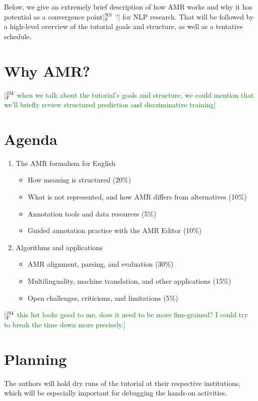 \documentclass[12pt,a4paper]{article}
\newcommand{\ensuretext}[1]{#1}
\newcommand{\jmfmarker}{\ensuretext{\textcolor{green}{\ensuremath{^{\textsc{JM}}_{\textsc{F}}}}}}
\newcommand{\nssmarker}{\ensuretext{\textcolor{magenta}{\ensuremath{^{\textsc{NS}}_{\textsc{S}}}}}}
\newcommand{\arkcomment}[3]{\ensuretext{\textcolor{#3}{[#1 #2]}}}
\newcommand{\jmf}[1]{\arkcomment{\jmfmarker}{#1}{green}}
\newcommand{\nss}[1]{\arkcomment{\nssmarker}{#1}{magenta}}
\begin{document}
Below, we give an extremely brief description of how AMR works and why it has potential 
as a convergence point\nss{?} for NLP research. 
That will be followed by a high-level overview of the tutorial goals and structure, 
as well as a tentative schedule.

\section{Why AMR?}

\jmf{when we talk about the tutorial's goals and structure, we could mention that we'll briefly review structured prediction and discriminative training}

\section{Agenda}

\begin{enumerate}
\item The AMR formalism for English \begin{itemize}
	\item How meaning is structured (20\%)
	\item What is not represented, and how AMR differs from alternatives (10\%)
	\item Annotation tools and data resources (5\%)
	\item Guided annotation practice with the AMR Editor (10\%)
	\end{itemize}
\item Algorithms and applications \begin{itemize}
	\item AMR alignment, parsing, and evaluation (30\%)
	\item Multilinguality, machine translation, and other applications (15\%)
	\item Open challenges, criticisms, and limitations (5\%)
	\end{itemize}
\end{enumerate}
\jmf{this list looks good to me, does it need to be more fine-grained? I could try to break the time down more precisely.}

\section{Planning}

The authors will hold dry runs of the tutorial at their respective institutions, 
which will be especially important for debugging the hands-on activities. 
\end{document}
